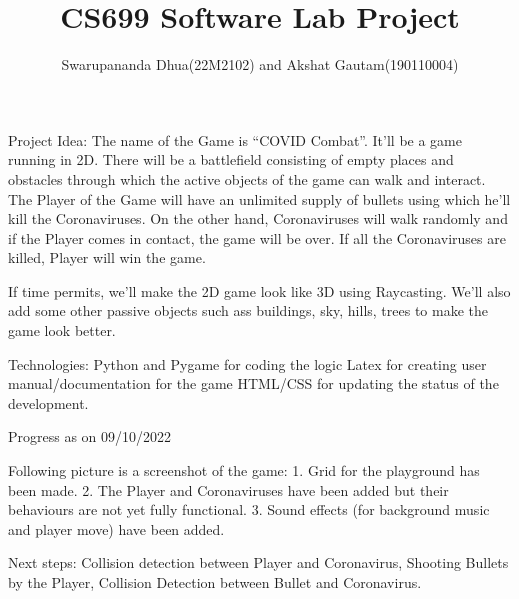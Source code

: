 \documentclass[a4paper,12pt]{report}
\title{CS699 Software Lab Project}
\author{Swarupananda Dhua(22M2102) and Akshat Gautam(190110004)}
\begin{document}
\maketitle

Project Idea: The name of the Game is “COVID Combat”. It’ll be a game running in 2D. There will be a battlefield consisting of empty places and obstacles through which the active objects of the game can walk and interact. The Player of the Game will have an unlimited supply of bullets using which he’ll kill the Coronaviruses. On the other hand, Coronaviruses will walk randomly and if the Player comes in contact, the game will be over. If all the Coronaviruses are killed, Player will win the game.

If time permits, we’ll make the 2D game look like 3D using Raycasting. We’ll also add some other passive objects such ass buildings, sky, hills, trees to make the game look better.

Technologies:
Python and Pygame for coding the logic
Latex for creating user manual/documentation for the game
HTML/CSS for updating the status of the development.


\newpage
Progress as on 09/10/2022

Following picture is a screenshot of the game:
1.	Grid for the playground has been made.
2.	The Player and Coronaviruses have been added but their behaviours are not yet fully functional.
3.	Sound effects (for background music and player move) have been added.

Next steps: Collision detection between Player and Coronavirus, Shooting Bullets by the Player, Collision Detection between Bullet and Coronavirus.
\end{document}
